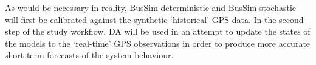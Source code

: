 As would be necessary in reality, BusSim-deterministic and BusSim-stochastic will first be calibrated against the synthetic `historical' GPS data. In the second step of the study workflow, DA will be used in an attempt to update the states of the models to the `real-time' GPS observations in order to produce more accurate short-term forecasts of the system behaviour. 
